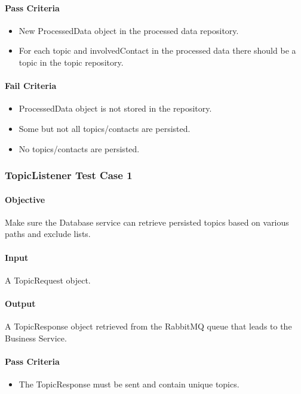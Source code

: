 \documentclass[hidelinks,english]{article}
\begin{document}
			\paragraph{Pass Criteria}
			\begin{itemize}
				\item New ProcessedData object in the processed data repository.
				\item For each topic and involvedContact in the processed data there should be a topic in the topic repository.
			\end{itemize}
			\paragraph{Fail Criteria}
			\begin{itemize}
				\item ProcessedData object is not stored in the repository.
				\item Some but not all topics/contacts are persisted.
				\item No topics/contacts are persisted.
			\end{itemize}
			
		\subsubsection{TopicListener Test Case 1}\label{databasetopiclistenertest1}
			\paragraph{Objective} Make sure the Database service can retrieve persisted topics based on various paths and exclude lists.
			\paragraph{Input} A TopicRequest object.
			\paragraph{Output} A TopicResponse object retrieved from the RabbitMQ queue that leads to the Business Service.
			\paragraph{Pass Criteria}
			\begin{itemize}
				\item The TopicResponse must be sent and contain unique topics.
			\end{itemize}
\end{document}
